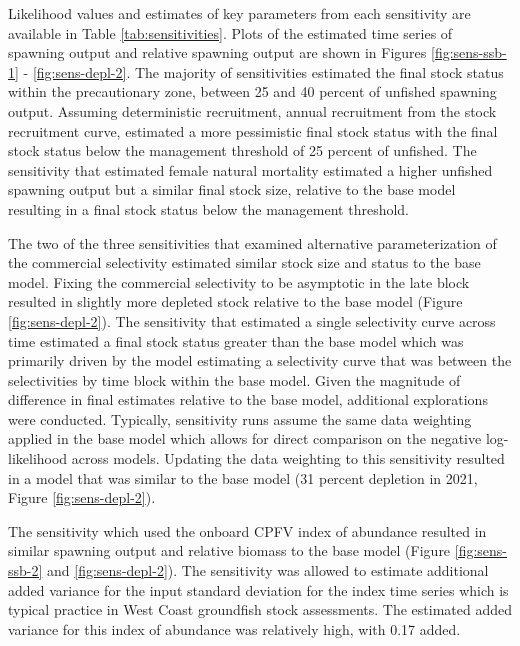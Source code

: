 \documentclass[11pt,
  english,
  a4paper,
]{article}
\begin{document}

Likelihood values and estimates of key parameters from each sensitivity are available in Table \ref{tab:sensitivities}. Plots of the estimated time series of spawning output and relative spawning output are shown in Figures \ref{fig:sens-ssb-1} - \ref{fig:sens-depl-2}. The majority of sensitivities estimated the final stock status within the precautionary zone, between 25 and 40 percent of unfished spawning output. Assuming deterministic recruitment, annual recruitment from the stock recruitment curve, estimated a more pessimistic final stock status with the final stock status below the management threshold of 25 percent of unfished. The sensitivity that estimated female natural mortality estimated a higher unfished spawning output but a similar final stock size, relative to the base model resulting in a final stock status below the management threshold.

\leavevmode\tagmcend\tagstructend\par


The two of the three sensitivities that examined alternative parameterization of the commercial selectivity estimated similar stock size and status to the base model. Fixing the commercial selectivity to be asymptotic in the late block resulted in slightly more depleted stock relative to the base model (Figure \ref{fig:sens-depl-2}). The sensitivity that estimated a single selectivity curve across time estimated a final stock status greater than the base model which was primarily driven by the model estimating a selectivity curve that was between the selectivities by time block within the base model. Given the magnitude of difference in final estimates relative to the base model, additional explorations were conducted. Typically, sensitivity runs assume the same data weighting applied in the base model which allows for direct comparison on the negative log-likelihood across models. Updating the data weighting to this sensitivity resulted in a model that was similar to the base model (31 percent depletion in 2021, Figure \ref{fig:sens-depl-2}).

\leavevmode\tagmcend\tagstructend\par


The sensitivity which used the onboard CPFV index of abundance resulted in similar spawning output and relative biomass to the base model (Figure \ref{fig:sens-ssb-2} and \ref{fig:sens-depl-2}). The sensitivity was allowed to estimate additional added variance for the input standard deviation for the index time series which is typical practice in West Coast groundfish stock assessments. The estimated added variance for this index of abundance was relatively high, with 0.17 added.
\end{document}
